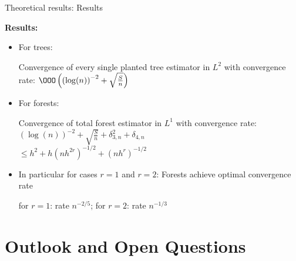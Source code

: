 \documentclass{beamer}
\begin{document}
\begin{frame}{Theoretical results: Results}

    \textbf{Results:}
    \begin{itemize}
        \item For trees:

        \begin{center}
            Convergence of every single planted tree estimator in \(L^2\) with convergence rate:
            \(\OOO \left( \left( \log(n) \right)^{-2} + \sqrt{\frac{S}{n}} \right) \)
        \end{center}
        
        \item For forests:

        \begin{center}
            Convergence of total forest estimator in \(L^1\) with convergence rate:\\
            \( \left( \log(n) \right)^{-2} + \sqrt{\frac{S}{n}} + \delta_{3,n}^2 + \delta_{4,n}\) \\
            \(\leq h^2 + h(nh^{2r})^{-1/2} + (nh^{r})^{-1/2}\)
        \end{center}
        
        \item In particular for cases \(r=1\) and \(r=2\): Forests achieve optimal convergence rate

        \begin{center}
        for \(r=1\): rate \(n^{-2/5}\); for \(r=2\): rate \(n^{-1/3}\)
            
        \end{center}
        
    \end{itemize}
    
\vspace{1cm}

\end{frame}



\section{Outlook and Open Questions}



\end{document}
